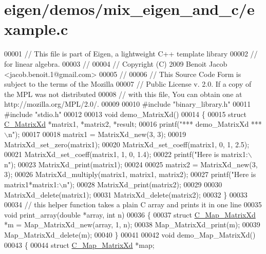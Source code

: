 \hypertarget{eigen_2demos_2mix__eigen__and__c_2example_8c_source}{}\section{eigen/demos/mix\+\_\+eigen\+\_\+and\+\_\+c/example.c}
\label{eigen_2demos_2mix__eigen__and__c_2example_8c_source}

\begin{DoxyCode}
00001 \textcolor{comment}{// This file is part of Eigen, a lightweight C++ template library}
00002 \textcolor{comment}{// for linear algebra.}
00003 \textcolor{comment}{//}
00004 \textcolor{comment}{// Copyright (C) 2009 Benoit Jacob <jacob.benoit.1@gmail.com>}
00005 \textcolor{comment}{//}
00006 \textcolor{comment}{// This Source Code Form is subject to the terms of the Mozilla}
00007 \textcolor{comment}{// Public License v. 2.0. If a copy of the MPL was not distributed}
00008 \textcolor{comment}{// with this file, You can obtain one at http://mozilla.org/MPL/2.0/.}
00009 
00010 \textcolor{preprocessor}{#include "binary\_library.h"}
00011 \textcolor{preprocessor}{#include "stdio.h"}
00012 
00013 \textcolor{keywordtype}{void} demo\_MatrixXd()
00014 \{
00015   \textcolor{keyword}{struct }\hyperlink{struct_c___matrix_xd}{C\_MatrixXd} *matrix1, *matrix2, *result;
00016   printf(\textcolor{stringliteral}{"*** demo\_MatrixXd ***\(\backslash\)n"});
00017   
00018   matrix1 = MatrixXd\_new(3, 3);
00019   MatrixXd\_set\_zero(matrix1);
00020   MatrixXd\_set\_coeff(matrix1, 0, 1, 2.5);
00021   MatrixXd\_set\_coeff(matrix1, 1, 0, 1.4);
00022   printf(\textcolor{stringliteral}{"Here is matrix1:\(\backslash\)n"});
00023   MatrixXd\_print(matrix1);
00024 
00025   matrix2 = MatrixXd\_new(3, 3);
00026   MatrixXd\_multiply(matrix1, matrix1, matrix2);
00027   printf(\textcolor{stringliteral}{"Here is matrix1*matrix1:\(\backslash\)n"});
00028   MatrixXd\_print(matrix2);
00029 
00030   MatrixXd\_delete(matrix1);
00031   MatrixXd\_delete(matrix2);
00032 \}
00033 
00034 \textcolor{comment}{// this helper function takes a plain C array and prints it in one line}
00035 \textcolor{keywordtype}{void} print\_array(\textcolor{keywordtype}{double} *array, \textcolor{keywordtype}{int} n)
00036 \{
00037   \textcolor{keyword}{struct }\hyperlink{struct_c___map___matrix_xd}{C\_Map\_MatrixXd} *m = Map\_MatrixXd\_new(array, 1, n);
00038   Map\_MatrixXd\_print(m);
00039   Map\_MatrixXd\_delete(m);
00040 \}
00041 
00042 \textcolor{keywordtype}{void} demo\_Map\_MatrixXd()
00043 \{
00044   \textcolor{keyword}{struct }\hyperlink{struct_c___map___matrix_xd}{C\_Map\_MatrixXd} *map;

\end{DoxyCode}
